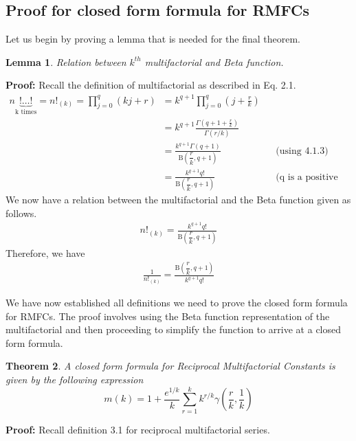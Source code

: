 \documentclass[12pt]{article}
\numberwithin{equation}{section}
\newcommand{\QED}{\tag*{$\square$}}
\newtheorem{theorem}{Theorem}[section]
\newtheorem{lemma}[theorem]{Lemma}
\begin{document}
\subsection{Proof for closed form formula for RMFCs}
Let us begin by proving a lemma that is needed for the final theorem.
\begin{lemma}
Relation between $k^{th}$ multifactorial and Beta function.
\end{lemma}
\textbf{Proof: }Recall the definition of multifactorial as described in Eq. 2.1.
\begin{align*}
    n\underbrace{!\ldots!}_{\text{k times}}=n!_{(k)}=\prod_{j=0}^q(kj+r)&=k^{q+1}\prod_{j=0}^q\left(j+\frac rk\right)\\
&=k^{q+1}\frac{\Gamma(q+1+\frac{r}{k})}{\Gamma(r/k)}\\
&=\frac{k^{q+1}\Gamma(q+1)}{\mathrm{B}\left (\dfrac{r}{k}, q+1\right )} && \text{(using 4.1.3)}\\
&=\frac{k^{q+1}q!}{\mathrm{B}\left (\dfrac{r}{k}, q+1\right )} && \text{(q is a positive integer)}
\end{align*}
We now have a relation between the multifactorial and the Beta function given as follows.
\begin{align}
    n!_{(k)}=\frac{k^{q+1}q!}{\mathrm{B}\left (\dfrac{r}{k}, q+1\right )}
\end{align}
Therefore, we have 
\begin{align*}
    \frac{1}{n!_{(k)}}=\frac{\mathrm{B}\left (\dfrac{r}{k}, q+1\right )}{k^{q+1}q!} \QED
\end{align*}\par
We have now established all definitions we need to prove the closed form formula for RMFCs. The proof involves using the Beta function representation of the multifactorial and then proceeding to simplify the function to arrive at a closed form formula.\cite{RMFCwolfram}\cite{stackproof}
\begin{theorem}A closed form formula for Reciprocal Multifactorial Constants is given by the following expression
$$m(k)=1+\frac{e^{1/k}}{k}\sum_{r=1}^{k}k^{r/k}\gamma\left ( \frac{r}{k}, \frac{1}{k} \right )$$
\end{theorem}\par 
\textbf{Proof: }Recall definition 3.1 for reciprocal multifactorial series.
\end{document}
